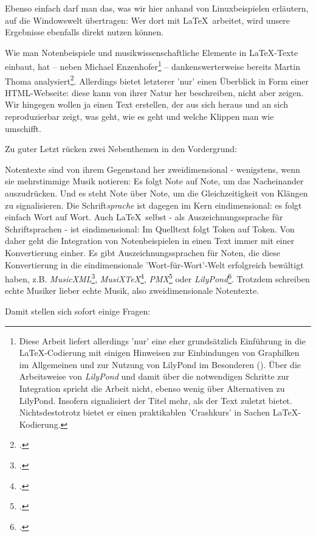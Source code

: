 Ebenso einfach darf man das, was wir hier anhand von Linuxbeispielen erläutern,
auf die Windowswelt übertragen: Wer dort mit \LaTeX\ arbeitet, wird unsere
Ergebnisse ebenfalls direkt nutzen können.

Wie man Notenbeispiele und musikwissenschaftliche Elemente in \LaTeX-Texte
einbaut, hat -- neben Michael Enzenhofer\footnote{Diese Arbeit liefert
allerdings 'nur' eine eher grundsätzlich Einführung in die \LaTeX-Co\-die\-rung
mit einigen Hinweisen zur Einbindungen von Graphilken im Allgemeinen und zur
Nutzung von LilyPond im Besonderen (\cite[vgl. dazu][4ff, 31ff u.
21ff]{Enzenhofer2016a}). Über die Arbeitsweise von \textit{LilyPond} und damit
über die notwendigen Schritte zur Integration spricht die Arbeit nicht, ebenso
wenig über Alternativen zu LilyPond. Insofern signalisiert der Titel mehr, als
der Text zuletzt bietet. Nichtsdestotrotz bietet er einen praktikablen
'Crashkurs' in Sachen \LaTeX-Kodierung.} -- dankenswerterweise bereits Martin
Thoma analysiert\footcite[vgl.][\nopage wp]{Thoma2018a}. Allerdings bietet
letzterer 'nur' einen Überblick in Form einer HTML-Webseite: diese kann von
ihrer Natur her beschreiben, nicht aber zeigen. Wir hingegen wollen ja einen
Text erstellen, der aus sich heraus und an sich reproduzierbar zeigt, was geht,
wie es geht und welche Klippen man wie umschifft.

Zu guter Letzt rücken zwei Nebenthemen in den Vordergrund:

Notentexte sind von ihrem Gegenstand her zweidimensional - wenigstens, wenn sie
mehrstimmige Musik notieren: Es folgt Note auf Note, um das Nacheinander
auszudrücken. Und es steht Note über Note, um die Gleichzeitigkeit von Klängen
zu signalisieren. Die Schrift\textit{sprache} ist dagegen im Kern eindimensional:
es folgt einfach Wort auf Wort. Auch \LaTeX\ selbst - als Auszeichnungssprache
für Schriftsprachen - ist eindimensional: Im Quelltext folgt Token auf Token.
Von daher geht die Integration von Notenbeispielen in einen Text immer mit einer
Konvertierung einher. Es gibt Auszeichnungssprachen für Noten, die diese
Konvertierung in die eindimensionale 'Wort-für-Wort'-Welt erfolgreich bewältigt
haben, z.B. \textit{MusicXML}\footcite[vgl.][\nopage wp]{MusicXML2018a},
\textit{MusiX\TeX}\footcite[vgl.][\nopage wp]{CtanMusixTex2018a},
\textit{PMX}\footcite[vgl.][\nopage wp]{CtanPmx2018a} oder
\textit{LilyPond}\footcite[vgl.][\nopage wp]{LilyPond2018a}. Trotzdem schreiben
echte Musiker lieber echte Musik, also zweidimensionale Notentexte.

Damit stellen sich sofort einige Fragen:

